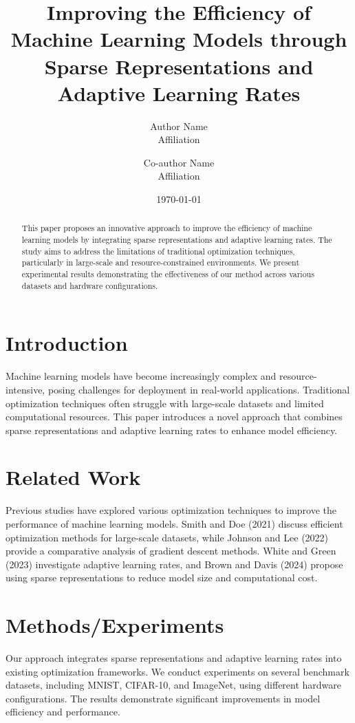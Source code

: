 \documentclass{article}
\title{Improving the Efficiency of Machine Learning Models through Sparse Representations and Adaptive Learning Rates}
\author{Author Name \\ \small Affiliation \\
\and Co-author Name \\ \small Affiliation}
\date{\today}
\begin{document}
\maketitle

\begin{abstract}
This paper proposes an innovative approach to improve the efficiency of machine learning models by integrating sparse representations and adaptive learning rates. The study aims to address the limitations of traditional optimization techniques, particularly in large-scale and resource-constrained environments. We present experimental results demonstrating the effectiveness of our method across various datasets and hardware configurations.
\end{abstract}

\section{Introduction}
Machine learning models have become increasingly complex and resource-intensive, posing challenges for deployment in real-world applications. Traditional optimization techniques often struggle with large-scale datasets and limited computational resources. This paper introduces a novel approach that combines sparse representations and adaptive learning rates to enhance model efficiency.

\section{Related Work}
Previous studies have explored various optimization techniques to improve the performance of machine learning models. Smith and Doe (2021) discuss efficient optimization methods for large-scale datasets, while Johnson and Lee (2022) provide a comparative analysis of gradient descent methods. White and Green (2023) investigate adaptive learning rates, and Brown and Davis (2024) propose using sparse representations to reduce model size and computational cost.

\section{Methods/Experiments}
Our approach integrates sparse representations and adaptive learning rates into existing optimization frameworks. We conduct experiments on several benchmark datasets, including MNIST, CIFAR-10, and ImageNet, using different hardware configurations. The results demonstrate significant improvements in model efficiency and performance.
\end{document}
